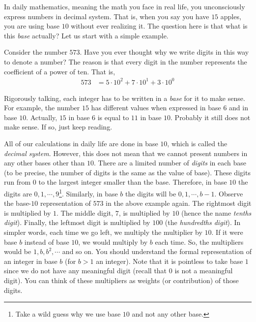 In daily mathematics, meaning the math you face in real life, you unconsciously express numbers in decimal system. That is, when you say you have $15$ apples, you are using base $10$ without ever realizing it. The question here is that what is this \textit{base} actually? Let us start with a simple example.
	\begin{example}
		Consider the number $573$. Have you ever thought why we write digits in this way to denote a number? The reason is that every digit in the number represents the coefficient of a power of ten. That is,
		\begin{align*}
			573
				& = 5 \cdot 10^2 + 7 \cdot 10^1 + 3 \cdot 10^0
		\end{align*}
	\end{example}
Rigorously talking, each integer has to be written in a \textit{base} for it to make sense. For example, the number $15$ has different values when expressed in base $6$ and in base $10$. Actually, $15$ in base $6$ is equal to $11$ in base $10$. Probably it still does not make sense. If so, just keep reading.

All of our calculations in daily life are done in base $10$, which is called the \textit{decimal system}. However, this does not mean that we cannot present numbers in any other bases other than $10$. There are a limited number of \textit{digits} in each base (to be precise, the number of digits is the same as the value of base). These digits run from $0$ to the largest integer smaller than the base. Therefore, in base $10$ the digits are $0,1,\cdots,9$\footnote{Take a wild guess why we use base $10$ and not any other base.}. Similarly, in base $b$ the digits will be $0,1,\cdots,b-1$. Observe the base-$10$ representation of $573$ in the above example again. The rightmost digit is multiplied by $1$. The middle digit, $7$, is multiplied by $10$ (hence the name \textit{tenths digit}). Finally, the leftmost digit is multiplied by $100$ (the \textit{hundredths digit}). In simpler words, each time we go left, we multiply the multiplier by $10$. If it were base $b$ instead of base $10$, we would multiply by $b$ each time. So, the multipliers would be $1,b,b^2,\cdots$ and so on. You should understand the formal representation of an integer in base $b$ (for $b>1$ an integer). Note that it is pointless to take base $1$ since we do not have any meaningful digit (recall that $0$ is not a meaningful digit). You can think of these multipliers as weights (or contribution) of those digits.

